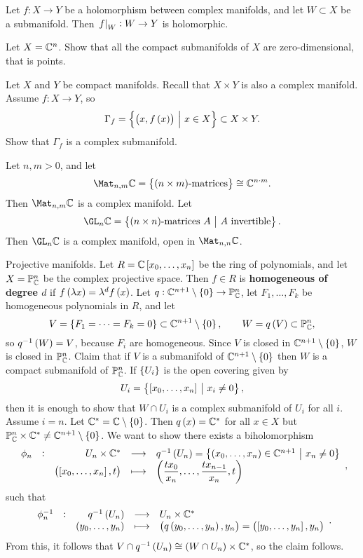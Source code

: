 \begin{example}
Let $ f : X \to Y $ be a holomorphism between complex manifolds, and let $ W \subset X $ be a submanifold. Then $ \left. f \right|_W : W \to Y $ is holomorphic.
\end{example}

\begin{exercise}
Let $ X = \mathbb{C}^n $. Show that all the compact submanifolds of $ X $ are zero-dimensional, that is points.
\end{exercise}

\begin{exercise}
Let $ X $ and $ Y $ be compact manifolds. Recall that $ X \times Y $ is also a complex manifold. Assume $ f : X \to Y $, so
$$ \Gamma_f = \cbr{\br{x, f\br{x}} \st x \in X} \subset X \times Y. $$
Show that $ \Gamma_f $ is a complex submanifold.
\end{exercise}

\begin{example}
Let $ n, m > 0 $, and let
$$ \Mat_{n, m} \CC = \cbr{\text{$ \br{n \times m} $-matrices}} \cong \CC^{n \cdot m}. $$
Then $ \Mat_{n, m} \CC $ is a complex manifold. Let
$$ \GL_n \CC = \cbr{\text{$ \br{n \times n} $-matrices} \ A \st A \ \text{invertible}}. $$
Then $ \GL_n \CC $ is a complex manifold, open in $ \Mat_{n, n} \CC $.
\end{example}

\pagebreak

\begin{example}
Projective manifolds. Let $ R = \CC\sbr{x_0, \dots, x_n} $ be the ring of polynomials, and let $ X = \mathbb{P}_{\mathbb{C}}^n $ be the complex projective space. Then $ f \in R $ is \textbf{homogeneous of degree $ d $} if $ f\br{\lambda x} = \lambda^df\br{x} $. Let $ q : \CC^{n + 1} \setminus \cbr{0} \to \PP_\CC^n $, let $ F_1, \dots, F_k $ be homogeneous polynomials in $ R $, and let
$$ V = \cbr{F_1 = \dots = F_k = 0} \subset \CC^{n + 1} \setminus \cbr{0}, \qquad W = q\br{V} \subset \PP_\CC^n, $$
so $ q^{-1}\br{W} = V $, because $ F_i $ are homogeneous. Since $ V $ is closed in $ \CC^{n + 1} \setminus \cbr{0} $, $ W $ is closed in $ \mathbb{P}_{\mathbb{C}}^n $. Claim that if $ V $ is a submanifold of $ \CC^{n + 1} \setminus \cbr{0} $ then $ W $ is a compact submanifold of $ \mathbb{P}_{\mathbb{C}}^n $. If $ \cbr{U_i} $ is the open covering given by
$$ U_i = \cbr{\sbr{x_0, \dots, x_n} \st x_i \ne 0}, $$
then it is enough to show that $ W \cap U_i $ is a complex submanifold of $ U_i $ for all $ i $. Assume $ i = n $. Let $ \CC^* = \CC \setminus \cbr{0} $. Then $ q\br{x} = \CC^* $ for all $ x \in X $ but $ \PP_\CC^n \times \CC^* \ne \CC^{n + 1} \setminus \cbr{0} $. We want to show there exists a biholomorphism
$$ \function[\phi_n]{U_n \times \CC^*}{q^{-1}\br{U_n} = \cbr{\br{x_0, \dots, x_n} \in \CC^{n + 1} \st x_n \ne 0}}{\br{\sbr{x_0, \dots, x_n}, t}}{\br{\dfrac{tx_0}{x_n}, \dots, \dfrac{tx_{n - 1}}{x_n}, t}}, $$
such that
$$ \function[\phi_n^{-1}]{q^{-1}\br{U_n}}{U_n \times \CC^*}{\br{y_0, \dots, y_n}}{\br{q\br{y_0, \dots, y_n}, y_n} = \br{\sbr{y_0, \dots, y_n}, y_n}}. $$
From this, it follows that $ V \cap q^{-1}\br{U_n} \cong \br{W \cap U_n} \times \CC^* $, so the claim follows.
\end{example}

